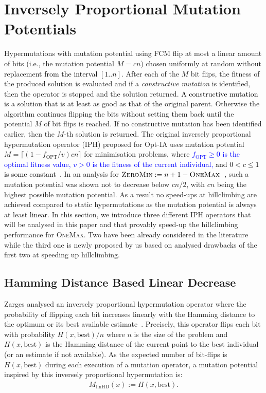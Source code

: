 \documentclass[lettersize,journal]{IEEEtran}
\newcommand{\new}[1]{\textcolor{black}{#1}}
\newcommand{\rev}[1]{\textcolor{blue}{#1}}
\newcommand{\IPHfcm}{IPH}
\begin{document}
 \section{Inversely Proportional Mutation Potentials} Hypermutations with mutation potential using FCM flip at most a linear amount of bits (i.e., the mutation potential $M=cn$) chosen uniformly at random without replacement \new{from the interval $[1..n]$}. After each of the $M$ bit flips, the fitness of the produced solution is evaluated and if a {\it constructive mutation} is identified, then the operator is stopped and the solution returned. \new{A  constructive mutation is a solution that is at least as good as that of the original parent.}
 Otherwise the algorithm continues flipping the bits without setting them back until the potential $M$ of bit flips is reached. If no constructive \new{mutation} has been identified earlier, then the $M$-th solution is returned.  
The original inversely proportional hypermutation operator (\IPHfcm{}) proposed for Opt-IA uses mutation potential  $M=\lceil(1-f_{\text{OPT}}/v)cn\rceil $ for minimisation problems, where \textcolor{blue}{$f_{\text{OPT}}\ge 0$ is the optimal fitness value, $v>0$ is the fitness of the current individual,} 
 \new{and $0<c\leq 1$ is some constant}~\cite{CutelloNicosiaPavoneTimmis2007,JansenZarges2011}. 
In an analysis for \rev{$\textsc{ZeroMin}:=n+1-\textsc {OneMax}$}~\cite{JansenZarges2011}, such a mutation potential was shown not to decrease below $cn/2$, with $cn$ being the highest possible mutation potential.
 	As a result no speed-ups at hillclimbing are achieved compared to static hypermutations as the mutation potential is always at least linear.
 In this section, we introduce three different IPH operators  that will be analysed in this paper and that provably speed-up the hillclimbing  performance for \textsc{OneMax}. Two have been already considered in the literature while the third one is newly proposed by us based on analysed drawbacks of the first two at speeding up hillclimbing.
 	 
 \subsection*{Hamming Distance Based Linear Decrease}
 Zarges analysed an inversely proportional hypermutation operator where the probability of flipping each bit increases linearly with the Hamming distance to the optimum or its best available estimate~\cite{Zarges2008}.
Precisely, this operator flips each bit with probability $H(x,\text{best})/n$ where $n$ is the size of the problem and $H(x,\text{best})$ is the Hamming distance of the current point to the best individual (or an estimate if not available). As the expected number of bit-flips is $H(x, \text{best})$ during each execution of a mutation operator, a mutation potential inspired by this inversely proportional hypermutation is:
\begin{align*}M_{\text{linHD}}(x):=H(x,\text{best}).
 \end{align*}
 
\end{document}
